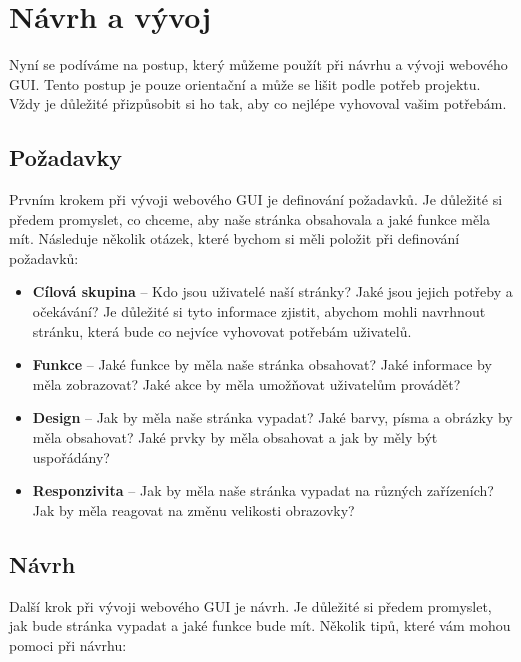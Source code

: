 \section{Návrh a vývoj}
\label{sec:design-and-development}

Nyní se podíváme na postup, který můžeme použít při návrhu a vývoji webového GUI. Tento postup je pouze orientační a může se lišit podle potřeb projektu. Vždy je důležité přizpůsobit si ho tak, aby co nejlépe vyhovoval vašim potřebám.

\subsection{Požadavky}
\label{subsec:requirements}

Prvním krokem při vývoji webového GUI je definování požadavků. Je důležité si předem promyslet, co chceme, aby naše stránka obsahovala a jaké funkce měla mít. Následuje několik otázek, které bychom si měli položit při definování požadavků:

\begin{itemize}
  \item \textbf{Cílová skupina} -- Kdo jsou uživatelé naší stránky? Jaké jsou jejich potřeby a očekávání? Je důležité si tyto informace zjistit, abychom mohli navrhnout stránku, která bude co nejvíce vyhovovat potřebám uživatelů.
  \item \textbf{Funkce} -- Jaké funkce by měla naše stránka obsahovat? Jaké informace by měla zobrazovat? Jaké akce by měla umožňovat uživatelům provádět?
  \item \textbf{Design} -- Jak by měla naše stránka vypadat? Jaké barvy, písma a obrázky by měla obsahovat? Jaké prvky by měla obsahovat a jak by měly být uspořádány?
  \item \textbf{Responzivita} -- Jak by měla naše stránka vypadat na různých zařízeních? Jak by měla reagovat na změnu velikosti obrazovky?
\end{itemize} 

\subsection{Návrh}
\label{subsec:design}

Další krok při vývoji webového GUI je návrh. Je důležité si předem promyslet, jak bude stránka vypadat a jaké funkce bude mít. Několik tipů, které vám mohou pomoci při návrhu:

